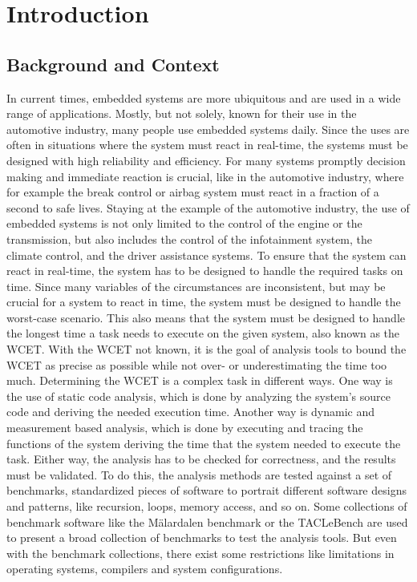 \chapter{Introduction}\label{ch:introduction}
\section{Background and Context}\label{sec:background}
In current times, embedded systems are more ubiquitous and are used in a wide range of applications. 
Mostly, but not solely, known for their use in the automotive industry, many people use embedded systems daily.
Since the uses are often in situations where the system must react in real-time, the systems must be designed with high reliability and efficiency.
For many systems promptly decision making and immediate reaction is crucial, like in the automotive industry, where for example the break control or airbag system must react in a fraction of a second to safe lives. 
Staying at the example of the automotive industry, the use of embedded systems is not only limited to the control of the engine or the transmission, but also includes the control of the infotainment system, the climate control, and the driver assistance systems.
To ensure that the system can react in real-time, the system has to be designed to handle the required tasks on time.
Since many variables of the circumstances are inconsistent, but may be crucial for a system to react in time, the system must be designed to handle the worst-case scenario.
This also means that the system must be designed to handle the longest time a task needs to execute on the given system, also known as the \ac{WCET}.
With the \ac{WCET} not known, it is the goal of analysis tools to bound the \ac{WCET} as precise as possible while not over- or underestimating the time too much.
Determining the \ac{WCET} is a complex task in different ways.
One way is the use of static code analysis, which is done by analyzing the system's source code and deriving the needed execution time\cite{buttazzoHardRealTimeComputing2024}.
Another way is dynamic and measurement based analysis, which is done by executing and tracing the functions of the system deriving the time that the system needed to execute the task\cite{buttazzoHardRealTimeComputing2024}.
Either way, the analysis has to be checked for correctness, and the results must be validated.
To do this, the analysis methods are tested against a set of benchmarks, standardized pieces of software to portrait different software designs and patterns, like recursion, loops, memory access, and so on.
Some collections of benchmark software like the Mälardalen benchmark\cite{gustafssonMalardalenWCETBenchmarks2012} or the TACLeBench\cite{falk_taclebench_2016} are used to present a broad collection of benchmarks to test the analysis tools.
But even with the benchmark collections, there exist some restrictions like limitations in operating systems, compilers and system configurations.\cite{falk_taclebench_2016,gustafssonMalardalenWCETBenchmarks2012}

